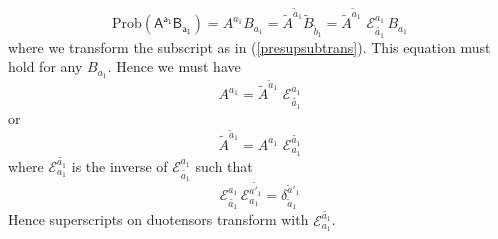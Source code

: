 \documentclass[10pt]{article}
\begin{document}
\begin{equation}
\text{Prob}(\mathsf{A^{a_1} B_{a_1}}) = A^{a_1} B_{a_1} = \tilde{A}^{\tilde{a}_1} \tilde{B}_{\tilde{b}_1} = \tilde{A}^{\tilde{a}_1}\,\, \mathcal{E}^{a_1}_{\tilde{a_1}}\, B_{a_1}
\end{equation}
where we transform the subscript as in (\ref{presupsubtrans}).  This equation must hold for any $B_{a_1}$.  Hence we must have
\begin{equation}
 A^{a_1} = \tilde{A}^{\tilde{a}_1}\,\, \mathcal{E}^{a_1}_{\tilde{a_1}}
\end{equation}
or
\begin{equation}
\tilde{A}^{\tilde{a}_1} =  A^{a_1} \,\, \mathcal{E}_{a_1}^{\tilde{a_1}}
\end{equation}
where $\mathcal{E}_{a_1}^{\tilde{a_1}}$ is the inverse of $\mathcal{E}^{a_1}_{\tilde{a_1}}$ such that
\begin{equation}
\mathcal{E}^{a_1}_{\tilde{a_1}} \, \mathcal{E}_{a_1}^{\tilde{a'_1}} = \delta_{\tilde{a}_1}^{\tilde{a}'_1}
\end{equation}
Hence superscripts on duotensors transform with $\mathcal{E}_{a_1}^{\tilde{a_1}}$.
\end{document}
